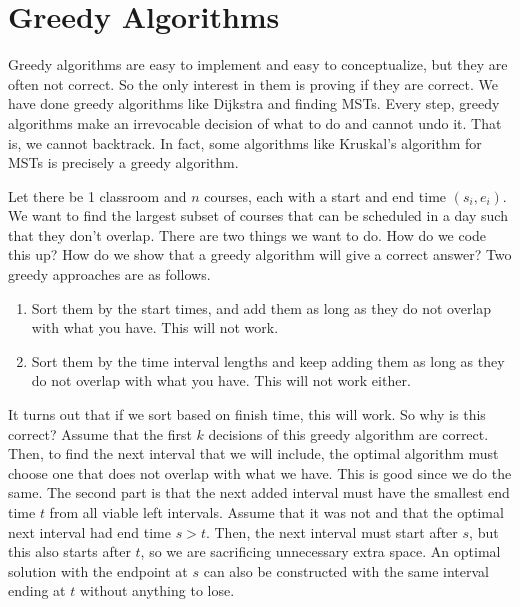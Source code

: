 \section{Greedy Algorithms}

  Greedy algorithms are easy to implement and easy to conceptualize, but they are often not correct. So the only interest in them is proving if they are correct. We have done greedy algorithms like Dijkstra and finding MSTs. Every step, greedy algorithms make an irrevocable decision of what to do and cannot undo it. That is, we cannot backtrack. In fact, some algorithms like Kruskal's algorithm for MSTs is precisely a greedy algorithm. 
  
  \begin{example}
    Let there be 1 classroom and $n$ courses, each with a start and end time $(s_i, e_i)$. We want to find the largest subset of courses that can be scheduled in a day such that they don't overlap. There are two things we want to do. How do we code this up? How do we show that a greedy algorithm will give a correct answer? Two greedy approaches are as follows. 
    \begin{enumerate}
      \item Sort them by the start times, and add them as long as they do not overlap with what you have. This will not work. 
      \item Sort them by the time interval lengths and keep adding them as long as they do not overlap with what you have. This will not work either. 
    \end{enumerate}
    It turns out that if we sort based on finish time, this will work. So why is this correct? Assume that the first $k$ decisions of this greedy algorithm are correct. Then, to find the next interval that we will include, the optimal algorithm must choose one that does not overlap with what we have. This is good since we do the same. The second part is that the next added interval must have the smallest end time $t$ from all viable left intervals. Assume that it was not and that the optimal next interval had end time $s > t$. Then, the next interval must start after $s$, but this also starts after $t$, so we are sacrificing unnecessary extra space. An optimal solution with the endpoint at $s$ can also be constructed with the same interval ending at $t$ without anything to lose. 


\end{example}
